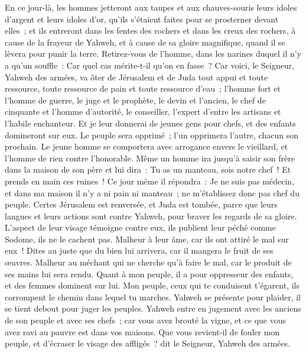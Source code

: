 \begin{multicols}{2}
En ce jour-là, les hommes jetteront aux taupes et aux chauves-souris leurs idoles d'argent et leurs idoles d'or, qu'ils s'étaient faites pour se prosterner devant elles~;
et ils entreront dans les fentes des rochers et dans les creux des rochers, à cause de la frayeur de Yahweh, et à cause de sa gloire magnifique, quand il se lèvera pour punir la terre.
Retirez-vous de l'homme, dans les narines duquel il n'y a qu'un souffle~: Car quel cas mérite-t-il qu'on en fasse~?
\VerseOne{}Car voici, le Seigneur, Yahweh des armées, va ôter de Jérusalem et de Juda tout appui et toute ressource, toute ressource de pain et toute ressource d'eau~;
l'homme fort et l'homme de guerre, le juge et le prophète, le devin et l'ancien,
le chef de cinquante et l'homme d'autorité, le conseiller, l'expert d'entre les artisans et l'habile enchanteur.
Et je leur donnerai de jeunes gens pour chefs, et des enfants domineront sur eux.
Le peuple sera opprimé~; l'un opprimera l'autre, chacun son prochain. Le jeune homme se comportera avec arrogance envers le vieillard, et l'homme de rien contre l'honorable.
Même un homme ira jusqu'à saisir son frère dans la maison de son père et lui dira~: Tu as un manteau, sois notre chef~! Et prends en main ces ruines~!
Ce jour même il répondra~: Je ne suis pas médecin, et dans ma maison il n'y a ni pain ni manteau~; ne m'établissez donc pas chef du peuple.
Certes Jérusalem est renversée, et Juda est tombée, parce que leurs langues et leurs actions sont contre Yahweh, pour braver les regards de sa gloire.
L'aspect de leur visage témoigne contre eux, ils publient leur péché comme Sodome, ils ne le cachent pas. Malheur à leur âme, car ils ont attiré le mal sur eux~!
Dites au juste que du bien lui arrivera, car il mangera le fruit de ses œuvres.
Malheur au méchant qui ne cherche qu'à faire le mal, car le produit de ses mains lui sera rendu.
Quant à mon peuple, il a pour oppresseur des enfants, et des femmes dominent sur lui. Mon peuple, ceux qui te conduisent t'égarent, ils corrompent le chemin dans lequel tu marches.
Yahweh se présente pour plaider, il se tient debout pour juger les peuples.
Yahweh entre en jugement avec les anciens de son peuple et avec ses chefs~; car vous avez brouté la vigne, et ce que vous avez ravi au pauvre est dans vos maisons.
Que vous revient-il de fouler mon peuple, et d'écraser le visage des affligés~? dit le Seigneur, Yahweh des armées.

\end{multicols}
